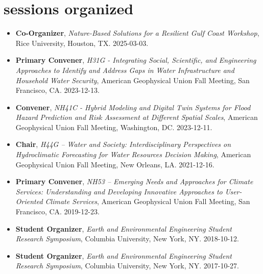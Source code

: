 \documentclass[10pt,oneside]{article}
\begin{document}

\section{sessions organized}

\mbox{}\vspace{-\dimexpr\baselineskip\relax}

\begin{itemize}[label={}]

  \item \textbf{Co-Organizer}, \textit{Nature-Based Solutions for a Resilient Gulf Coast Workshop}, Rice University, Houston, TX. 2025-03-03.

  \item \textbf{Primary Convener}, \textit{H31G - Integrating Social, Scientific, and Engineering Approaches to Identify and Address Gaps in Water Infrastructure and Household Water Security}, American Geophysical Union Fall Meeting, San Francisco, CA. 2023-12-13.

  \item \textbf{Convener}, \textit{NH41C - Hybrid Modeling and Digital Twin Systems for Flood Hazard Prediction and Risk Assessment at Different Spatial Scales}, American Geophysical Union Fall Meeting, Washington, DC. 2023-12-11.

  \item \textbf{Chair}, \textit{H44G -- Water and Society: Interdisciplinary Perspectives on Hydroclimatic Forecasting for Water Resources Decision Making}, American Geophysical Union Fall Meeting, New Orleans, LA. 2021-12-16.

  \item \textbf{Primary Convener}, \textit{NH53 -- Emerging Needs and Approaches for Climate Services: Understanding and Developing Innovative Approaches to User-Oriented Climate Services}, American Geophysical Union Fall Meeting, San Francisco, CA. 2019-12-23.

  \item \textbf{Student Organizer}, \textit{Earth and Environmental Engineering Student Research Symposium}, Columbia University, New York, NY. 2018-10-12.

  \item \textbf{Student Organizer}, \textit{Earth and Environmental Engineering Student Research Symposium}, Columbia University, New York, NY. 2017-10-27.

\end{itemize}
\end{document}
